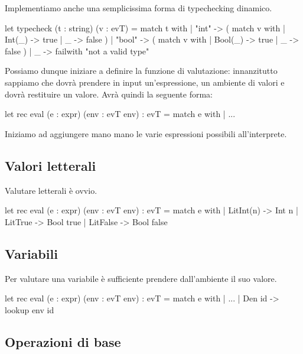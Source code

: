 Implementiamo anche una semplicissima forma di typechecking dinamico.

\begin{OCaml}
let typecheck (t : string) (v : evT) =
  match t with
  | "int" -> 
    ( match v with
    | Int(_) -> true
    | _      -> false )
  | "bool" -> 
    ( match v with
    | Bool(_) -> true
    | _      -> false )
  | _ -> failwith "not a valid type"
\end{OCaml}

Possiamo dunque iniziare a definire la funzione di valutazione: innanzitutto sappiamo che dovrà prendere in input un'espressione, un ambiente di valori e dovrà restituire un valore. Avrà quindi la seguente forma: 
\begin{OCaml}
let rec eval (e : expr) (env : evT env) : evT =
  match e with
  | ...
\end{OCaml}

Iniziamo ad aggiungere mano mano le varie espressioni possibili all'interprete.

\subsection*{Valori letterali}

Valutare letterali è ovvio.
\begin{OCaml}
let rec eval (e : expr) (env : evT env) : evT =
  match e with
  | LitInt(n) -> Int n
  | LitTrue   -> Bool true
  | LitFalse  -> Bool false
\end{OCaml}

\subsection*{Variabili}

Per valutare una variabile è sufficiente prendere dall'ambiente il suo valore.
\begin{OCaml}
let rec eval (e : expr) (env : evT env) : evT =
  match e with
  | ...
  | Den id          -> lookup env id
\end{OCaml}

\subsection*{Operazioni di base}

